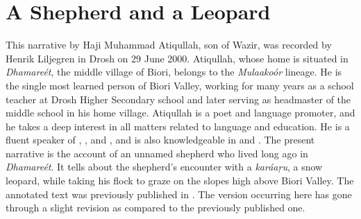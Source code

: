 \appendix
{}

\section*{A Shepherd and a Leopard}

This narrative by Haji Muhammad Atiqullah, son of Wazir, was recorded by Henrik Liljegren in Drosh on 29 June 2000. Atiqullah, whose home is situated in \textit{Dhamareét}, the middle village of Biori, belongs to the \textit{Mulaakoór} lineage. He is the single most learned person of Biori Valley, working for many years as a school teacher at Drosh Higher Secondary school and later serving as headmaster of the middle school in his home village. Atiqullah is a poet and language promoter, and he takes a deep interest in all matters related to language and education. He is a fluent speaker of , ,  and , and is also knowledgeable in  and . The present narrative is the account of an unnamed shepherd who lived long ago in \textit{Dhamareét}. It tells about the shepherd’s encounter with a \textit{karáaṛu}, a snow leopard, while taking his flock to graze on the slopes high above Biori Valley. The annotated text was previously published in \citet[182--187]{liljegrenhaider2015}. The version occurring here has gone through a slight revision as compared to the previously published one.


